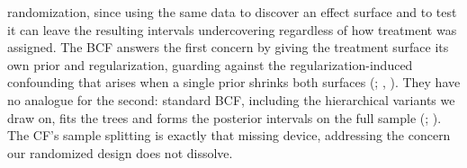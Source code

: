 \documentclass[
  10pt,
  a4paper,
  DIV=11,
  numbers=noendperiod]{scrartcl}
\begin{document}
randomization, since using the same data to discover an effect surface
and to test it can leave the resulting intervals undercovering
regardless of how treatment was assigned. The BCF answers the first
concern by giving the treatment surface its own prior and
regularization, guarding against the regularization-induced confounding
that arises when a single prior shrinks both surfaces
(;
,
). They have no analogue for
the second: standard BCF, including the hierarchical variants we draw
on, fits the trees and forms the posterior intervals on the full sample
(;
). The CF's sample
splitting is exactly that missing device, addressing the concern our
randomized design does not dissolve.
\end{document}
